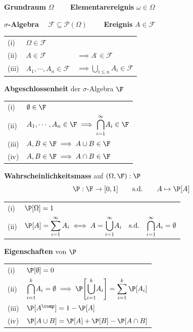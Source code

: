  \textbf{Grundraum} $\Omega\qquad$ \textbf{Elementarereignis} $\omega \in \Omega$

 \textbf{$\sigma$-Algebra} $\quad \mathcal{F} \subseteq \mathcal{P}(\Omega)\qquad$ \textbf{Ereignis} $A \in \mathcal{F}$

\begin{tabular}{lll}
    (i)     & $\Omega \in \mathcal{F}$ \\
    (ii)    & $A \in \mathcal{F}$               & $\implies A^\comp \in \mathcal{F}$ \\
    (iii)   & $A_1,\cdots,A_n \in \mathcal{F}$  & $\implies \displaystyle\underset{i \leq n}{\bigcup} A_i \in \mathcal{F}$
\end{tabular}

\lemma \textbf{Abgeschlossenheit} der $\sigma$-Algebra $\F$

\begin{tabular}{ll}
    (i)     & $\emptyset \in \F$ \\
    (ii)    & $A_1,\cdots,A_n \in \F \implies \displaystyle\overunderset{\infty}{i=1}{\bigcap} A_i \in \F$ \\
    (iii)   & $A, B \in \F \implies A \cup B \in \F$ \\
    (iv)    & $A, B \in \F \implies A \cap B \in \F$
\end{tabular}

 \textbf{Wahrscheinlichkeitsmass} auf $(\Omega, \F): \P$
$$
    \P: \F \to [0,1] \qquad \text{s.d.} \qquad A \mapsto \P[A]
$$
\begin{tabular}{ll}
    (i)     & $\P[\Omega] = 1$ \\
    (ii)    & $\P[A] = \displaystyle\sum_{i=1}^{\infty} A_i \iff A = \overunderset{\infty}{i=1}{\bigcup}A_i \quad \text{s.d.} \quad \overunderset{\infty}{i=1}{\bigcap}A_i = \emptyset$
\end{tabular}

\lemma \textbf{Eigenschaften} von $\P$

\begin{tabular}{ll}
    (i)     & $\P[\emptyset] = 0$ \\
    (ii)    & $\displaystyle\overunderset{k}{i=1}{\bigcap} A_i = \emptyset \implies \P\Biggl[ \overunderset{k}{i=1}{\bigcup} A_i \Biggr] = \sum_{i=1}^{k} \P[A_i]$ \\
    (iii)   & $\P[A^\comp] = 1 - \P[A]$ \\
    (iv)    & $\P[A \cup B] = \P[A] + \P[B] - \P[A \cap B]$
\end{tabular}

